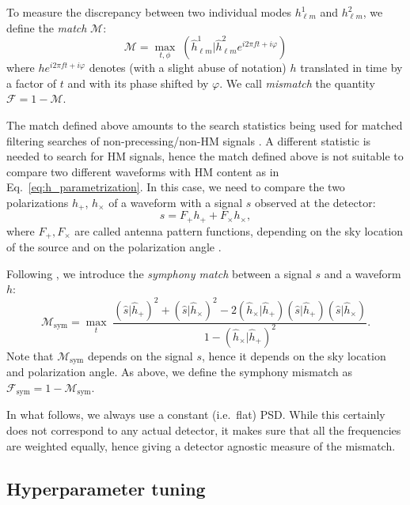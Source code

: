 \documentclass[twocolumn,showpacs,preprintnumbers,nofootinbib,prd,
superscriptaddress,10pt]{revtex4-1}
\newcommand{\rescalar}[2]{( #1 |#2 )}
\begin{document}
To measure the discrepancy between two individual modes $h^1_{\ell m}$ and $h^2_{\ell m}$, we define the {\it match} 
$\mathcal{M}$:
\begin{equation}\label{eq:match}
	\mathcal{M} = \max_{t,\phi} \; \rescalar{\hat{h}^1_{\ell m}}{\hat{h}^2_{\ell m} e^{i 2\pi ft + i \varphi}}
\end{equation}
where $h e^{i 2\pi ft + i \varphi}$ denotes (with a slight abuse of notation) $h$ translated in time by a factor of $t$ and with its phase shifted by $\varphi$.
We call {\it mismatch} the quantity $\mathcal{F} = 1 - \mathcal{M}$.

The match defined above amounts to the search statistics being used for matched filtering searches of non-precessing/non-HM signals \cite{Harry:2016ijz}.
A different statistic is needed to search for HM signals, hence the match defined above is not suitable to compare two different waveforms with HM content 
as in Eq.~\eqref{eq:h_parametrization}.
In this case, we need to compare the two polarizations $h_+$, $h_\times$ of a waveform with a signal $s$ observed at the 
detector:
\begin{equation}
	s = F_+ h_+ + F_\times h_\times,
\end{equation}
where $F_+, F_\times$ are called antenna pattern functions, depending on the sky location of the source and on the polarization angle \cite{Maggiore:2007ulw}.

Following \cite{Harry:2017weg}, we introduce the 
{\it symphony match} 
between a signal $s$ and a waveform $h$:
\begin{equation}\label{eq:match_sym}
\mathcal{M}_\mathrm{sym} 
	= \max_t \;
		\frac{ \rescalar{\hat{s}}{\hat{h}_+}^2 + \rescalar{\hat{s}}{\hat{h}_\times}^2 - 2 \rescalar{\hat{h}_\times}{\hat{h}_+} \rescalar{\hat{s}}{\hat{h}_+} \rescalar{\hat{s}}{\hat{h}_\times}}
		{1-\rescalar{\hat{h}_\times}{\hat{h}_+}^2}.
\end{equation}
Note that $\mathcal{M}_\mathrm{sym}$ depends on the signal $s$, hence it depends on the sky location and polarization angle.
As above, we define the symphony mismatch as $\mathcal{F}_\mathrm{sym} = 1 - \mathcal{M}_\mathrm{sym}$.

In what follows, we always use a constant (i.e.~flat) PSD. While this certainly does not correspond to any actual detector, it makes sure that all the frequencies are weighted equally, hence giving a detector agnostic measure of the mismatch.

\subsection{Hyperparameter tuning}
\label{sec:hyperparameter}
\end{document}

